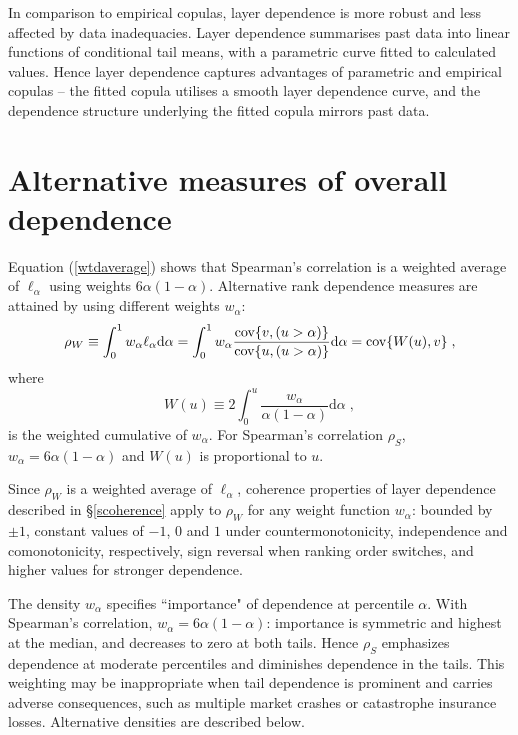 \documentclass[authoryear]{elsarticle}
\newcommand{\cov}{{\rm cov}}
\newcommand{\de}{\mathrm{d}}
\newcommand{\eref}[1]{(\ref{#1})}
\newcommand{\sref}[1]{\S\ref{#1}}
\begin{document}
In comparison to empirical copulas, layer dependence is more robust and less affected by data inadequacies. Layer dependence summarises past data into linear functions of conditional tail means, with a parametric curve fitted to calculated values. Hence layer dependence captures advantages of parametric and empirical copulas -- the fitted copula utilises a smooth layer dependence curve, and the dependence structure underlying the fitted copula mirrors past data.


\section{Alternative measures of overall dependence}\label{saltoverall}


Equation \eref{wtdaverage} shows that Spearman's correlation is a weighted average of  $\ell_\alpha$ using weights $6\alpha(1-\alpha)$. Alternative rank dependence measures are attained  by using different weights $w_\alpha$:
$$
\rho_W\equiv  \int_0^1 w_\alpha \ell_\alpha \de \alpha = \int_0^1 w_\alpha \frac{ \cov\{v,(u>\alpha)\}}{\cov\{u,(u>\alpha)\}} \de \alpha=\cov\{W(u),v\} \;,
$$
where
$$
W(u)\equiv 2\int_0^u \frac{w_\alpha}{\alpha(1-\alpha)}\de\alpha \;,
$$
is the weighted cumulative of $w_\alpha$.  For Spearman's correlation $\rho_S$, $w_\alpha=6\alpha(1-\alpha)$ and $W(u)$ is proportional to $u$.

Since $\rho_W$ is a weighted average of $\ell_\alpha$, coherence properties of layer dependence described in \sref{scoherence} apply to $\rho_W$ for any weight function $w_\alpha$: bounded by $\pm 1$, constant values of $-1$, $0$ and $1$ under countermonotonicity, independence and comonotonicity, respectively, sign reversal when ranking order switches, and higher values for stronger dependence.

The density $w_\alpha$ specifies ``importance" of dependence at percentile $\alpha$. With Spearman's correlation, $w_\alpha=6\alpha(1-\alpha)$: importance is symmetric and highest at the median, and decreases to zero at both tails. Hence $\rho_S$ emphasizes dependence at moderate percentiles and diminishes dependence in the tails. This weighting may be inappropriate when tail dependence is prominent and carries adverse consequences, such as multiple market crashes or catastrophe insurance losses. Alternative densities are described below.
\end{document}

